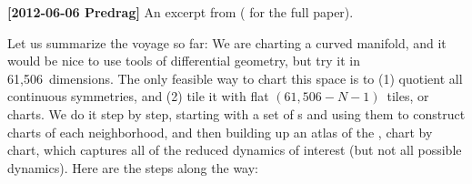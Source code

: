 {\bf [2012-06-06 Predrag]} An excerpt from 
(
for the full paper).

\bigskip

\noindent
Let us summarize the voyage so far: We are charting a curved manifold,
and it would be nice to use tools of differential geometry, but try it in
61,506~dimensions. The only feasible way to chart this space is to (1)
quotient all continuous symmetries, and (2) tile it with flat
$(61,506\!-\!N\!-\!1)$\dmn\ tiles, or charts. We do it step by step,
starting with a set of \template s and using them to construct charts of
each neighborhood, and then building up an atlas of the \emph{\slice},
chart by chart, which captures all of the reduced dynamics of interest
(but not all possible dynamics). Here are the steps along the way:

